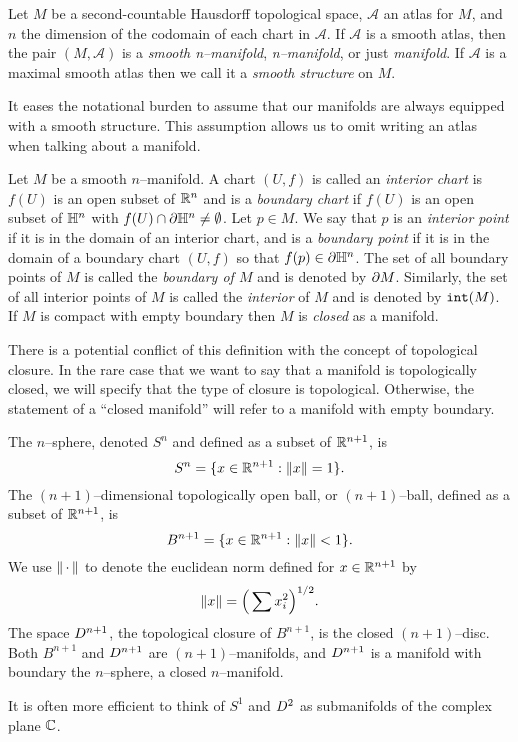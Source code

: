 \begin{defn}[Manifold]
	\label{def:manifold}
	Let $M$ be a second-countable Hausdorff topological space, $\mathcal{A}$ an atlas for $M$, and $n$ the dimension of the codomain of each chart in $\mathcal{A}$.
	If $\mathcal{A}$ is a smooth atlas, then the pair $(M,\mathcal{A})$ is a \emph{smooth n--manifold},  \emph{n--manifold}, or just \emph{manifold}.
	If $\mathcal{A}$ is a maximal smooth atlas then we call it a \emph{smooth structure} on $M$.
\end{defn}

It eases the notational burden to assume that our manifolds are always equipped with a smooth structure.
This assumption allows us to omit writing an atlas when talking about a manifold.
	
\begin{defn}[Boundary]
	Let $M$ be a smooth $n$--manifold.
	A chart $(U,f)$ is called an \emph{interior chart} is $f(U)$ is an open subset of $\mathbb{R}^n$ and is a \emph{boundary chart} if $f(U)$ is an open subset of $\mathbb{H}^n$ with $f(U)\cap\partial \mathbb{H}^n\neq\emptyset$.
	Let $p\in M$.
	We say that $p$ is an \emph{interior point} if it is in the domain of an interior chart, and is a \emph{boundary point} if it is in the domain of a boundary chart $(U,f)$ so that $f(p)\in\partial\mathbb{H}^n$.
	The set of all boundary points of $M$ is called the \emph{boundary of $M$} and is denoted by $\partial M$.
	Similarly, the set of all interior points of $M$ is called the \emph{interior} of $M$ and is denoted by $\mathtt{int}(M)$.
	If $M$ is compact with empty boundary then $M$ is \emph{closed} as a manifold.
\end{defn}

There is a potential conflict of this definition with the concept of topological closure.
In the rare case that we want to say that a manifold is topologically closed, we will specify that the type of closure is topological.
Otherwise, the statement of a ``closed manifold'' will refer to a manifold with empty boundary.

\begin{ex}
	The $n$--sphere, denoted $S^n$ and defined as a subset of $\mathbb{R}^{n+1}$, is
	\[
	S^n = \{x\in\mathbb{R}^{n+1}:\left\lVert x \right\rVert=1\}.
	\]
	The $(n+1)$--dimensional topologically open ball, or $(n+1)$--ball, defined as a subset of $\mathbb{R}^{n+1}$, is
	\[
	B^{n+1} = \{x\in\mathbb{R}^{n+1}:\left\lVert x \right\rVert< 1\}.
	\]
	We use $\left\lVert \,\cdot\, \right\rVert$ to denote the euclidean norm defined for $x\in\mathbb{R}^{n+1}$ by
	\[
	\left\lVert x \right\rVert = \Big( \sum x_i^2 \Big)^{1/2}.
	\]
	The space $D^{n+1}$, the topological closure of $B^{n+1}$, is the closed $(n+1)$--disc.
	Both $B^{n+1}$ and $D^{n+1}$ are $(n+1)$--manifolds, and $D^{n+1}$ is a manifold with boundary the $n$--sphere, a closed $n$--manifold.
	
	It is often more efficient to think of $S^1$ and $D^2$ as submanifolds of the complex plane $\mathbb{C}$.
\end{ex}
